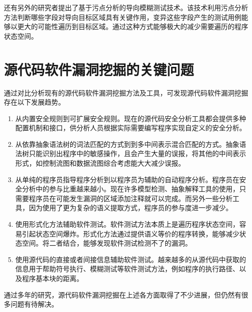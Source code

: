 还有另外的研究者提出了基于污点分析的导向模糊测试技术。该技术利用污点分析方法判断哪些字段对导向目标区域具有关键作用，变异这些字段产生的测试用例能够以更大的可能性遍历到目标区域。通过这种方式能够极大的减少需要遍历的程序状态空间。


\section{源代码软件漏洞挖掘的关键问题}

通过对比分析现有的源代码软件漏洞挖掘方法及工具，可发现源代码软件漏洞挖掘存在以下发展趋势。%
\begin{enumerate}[(1)]
\item 从内置安全规则到可扩展安全规则。现在的源代码安全分析工具都会提供多种配置机制和接口，供分析人员根据实际需要编写程序实现自定义的安全分析。
\item 从依靠抽象语法树的词法匹配的方式到到多中间表示混合匹配的方式。抽象语法树只能识别出程序中的敏感操作，且会产生大量的误报，将其他的中间表示形式，如控制流图和数据流图综合考虑能大大减少误报。
\item 从单纯的程序员指导程序分析到以程序员为辅助的自动程序分析。程序员在安全分析中的参与比重越来越小。现在许多模型检测、抽象解释工具的使用，只需要程序员在可能发生漏洞的区域添加注释就可以完成。而另外一些分析工具，因为使用了更为复杂的语义提取方式，程序员的参与度进一步减少。
\item 使用形式化方法辅助软件测试。软件测试方法本质上是遍历程序状态空间，容易引起状态空间爆炸。形式化方法通过提供语义等价的程序转换，能够减少状态空间。将二者结合，能够发现软件测试检测不了的漏洞。
\item 使用源代码的直接或者间接信息辅助软件测试。越来越多的从源代码中获取的信息用于帮助符号执行、模糊测试等软件测试方法，例如程序的执行路径、以及程序基本块的距离。
\end{enumerate}

通过多年的研究，源代码软件漏洞挖掘在上述各方面取得了不少进展，但仍然有很多问题有待解决。

